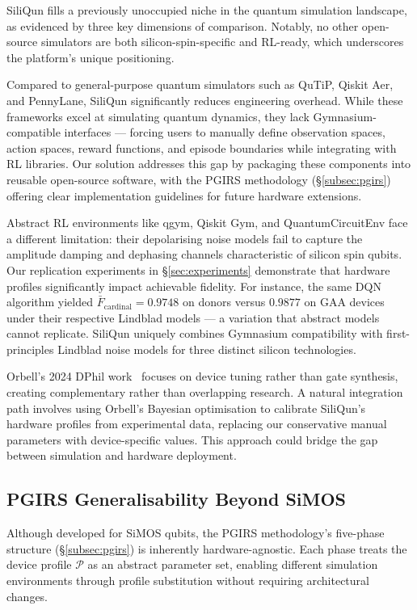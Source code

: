SiliQun fills a previously unoccupied niche in the quantum simulation landscape, as evidenced by three key dimensions of comparison. Notably, no other open-source simulators are both silicon-spin-specific and RL-ready, which underscores the platform's unique positioning.

Compared to general-purpose quantum simulators such as QuTiP, Qiskit Aer, and PennyLane, SiliQun significantly reduces engineering overhead. While these frameworks excel at simulating quantum dynamics, they lack Gymnasium-compatible interfaces — forcing users to manually define observation spaces, action spaces, reward functions, and episode boundaries while integrating with RL libraries. Our solution addresses this gap by packaging these components into reusable open-source software, with the PGIRS methodology (\S\ref{subsec:pgirs}) offering clear implementation guidelines for future hardware extensions.

Abstract RL environments like qgym, Qiskit Gym, and QuantumCircuitEnv face a different limitation: their depolarising noise models fail to capture the amplitude damping and dephasing channels characteristic of silicon spin qubits. Our replication experiments in \S\ref{sec:experiments} demonstrate that hardware profiles significantly impact achievable fidelity. For instance, the same DQN algorithm yielded $\bar{F}_\text{cardinal} = 0.9748$ on donors versus $0.9877$ on GAA devices under their respective Lindblad models — a variation that abstract models cannot replicate. SiliQun uniquely combines Gymnasium compatibility with first-principles Lindblad noise models for three distinct silicon technologies.

Orbell's 2024 DPhil work~\cite{Orbell2024} focuses on device tuning rather than gate synthesis, creating complementary rather than overlapping research. A natural integration path involves using Orbell's Bayesian optimisation to calibrate SiliQun's hardware profiles from experimental data, replacing our conservative manual parameters with device-specific values. This approach could bridge the gap between simulation and hardware deployment.

\subsection{PGIRS Generalisability Beyond SiMOS}
\label{subsec:generalisability}

Although developed for SiMOS qubits, the PGIRS methodology's five-phase structure (\S\ref{subsec:pgirs}) is inherently hardware-agnostic. Each phase treats the device profile $\mathcal{P}$ as an abstract parameter set, enabling different simulation environments through profile substitution without requiring architectural changes.

